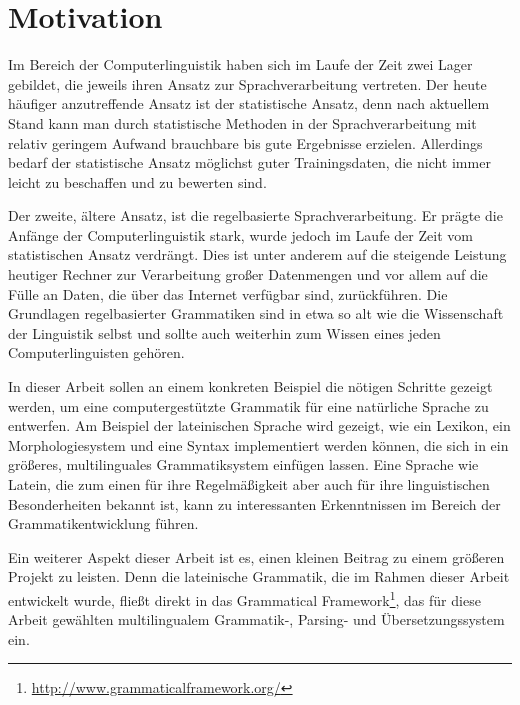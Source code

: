 \section{Motivation}
\label{sec:motivation}
Im Bereich der Computerlinguistik haben sich im Laufe der Zeit zwei Lager gebildet, die jeweils ihren Ansatz zur Sprachverarbeitung vertreten. Der heute häufiger anzutreffende Ansatz ist der statistische Ansatz, denn nach aktuellem Stand kann man durch statistische Methoden in der Sprachverarbeitung mit relativ geringem Aufwand brauchbare bis gute Ergebnisse erzielen. Allerdings bedarf der statistische Ansatz möglichst guter Trainingsdaten, die nicht immer leicht zu beschaffen und zu bewerten sind. \par
Der zweite, ältere Ansatz, ist die regelbasierte Sprachverarbeitung. Er prägte die Anfänge der Computerlinguistik stark, wurde jedoch im Laufe der Zeit vom statistischen Ansatz verdrängt. Dies ist unter anderem auf die steigende Leistung heutiger Rechner zur Verarbeitung großer Datenmengen und vor allem auf die Fülle an Daten, die über das Internet verfügbar sind, zurückführen. Die Grundlagen regelbasierter Grammatiken sind in etwa so alt wie die Wissenschaft der Linguistik selbst und sollte auch weiterhin zum Wissen eines jeden Computerlinguisten gehören. \par
In dieser Arbeit sollen an einem konkreten Beispiel die nötigen Schritte gezeigt werden, um eine computergestützte Grammatik für eine natürliche Sprache zu entwerfen. Am Beispiel der lateinischen Sprache wird gezeigt, wie ein Lexikon, ein Morphologiesystem und eine Syntax implementiert werden können, die sich in ein größeres, multilinguales Grammatiksystem einfügen lassen. Eine Sprache wie Latein, die zum einen für ihre Regelmäßigkeit aber auch für ihre linguistischen Besonderheiten bekannt ist, kann zu interessanten Erkenntnissen im Bereich der Grammatikentwicklung führen. \par
Ein weiterer Aspekt dieser Arbeit ist es, einen kleinen Beitrag zu einem größeren Projekt zu leisten. Denn die lateinische Grammatik, die im Rahmen dieser Arbeit entwickelt wurde, fließt direkt in das Grammatical Framework\footnote{\url{http://www.grammaticalframework.org/}}, das für diese Arbeit gewählten multilingualem Grammatik-, Parsing- und Übersetzungssystem ein.
\pagebreak
